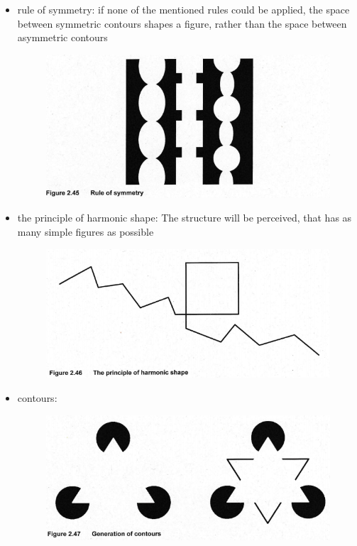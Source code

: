 \documentclass{standalone}
\begin{document}
\begin{itemize}
\begin{itemize}
\begin{figure}[H]
				\end{figure}
		\item rule of symmetry: if none of the mentioned rules could be applied, the space between symmetric contours shapes a figure, rather than the space between asymmetric contours
			\begin{figure}[H]
				\centering
				\includegraphics[width = 0.5\linewidth]{Figures/2_45.png}
			\end{figure}
		\item the principle of harmonic shape: The structure will be perceived, that has as many simple figures as possible
			\begin{figure}[H]
			\centering
			\includegraphics[width = 0.5\linewidth]{Figures/2_46.png}
			\end{figure}
		\item contours: 
			\begin{figure}[H]
			\centering
			\includegraphics[width = 0.7\linewidth]{Figures/2_47.png}
			\end{figure}
	\end{itemize}
\end{itemize}
\end{document}
